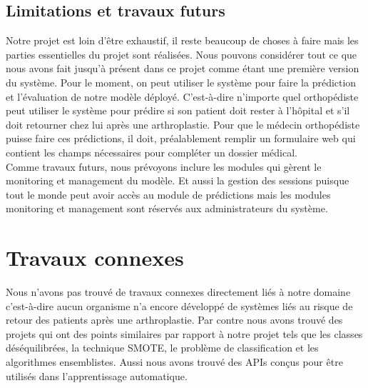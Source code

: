 \documentclass[12pt, french]{report}
\begin{document}
\section{Limitations et travaux futurs}
Notre projet est loin d'être exhaustif, il reste beaucoup de choses à faire mais les parties essentielles du projet sont réalisées. Nous pouvons considérer tout ce que nous avons fait jusqu'à présent dans ce projet comme étant une première version du système. Pour le moment, on peut utiliser le système pour faire la prédiction et l'évaluation de notre modèle déployé. C'est-à-dire n'importe quel orthopédiste peut utiliser le système pour prédire si son patient doit rester à l'hôpital et s'il doit retourner chez lui après une arthroplastie. Pour que le médecin orthopédiste puisse faire ces prédictions, il doit, préalablement remplir un formulaire web qui contient les champs nécessaires pour compléter un dossier médical.   \\

Comme travaux futurs, nous prévoyons inclure les modules qui gèrent le monitoring et management du modèle. Et aussi la gestion des sessions puisque tout le monde peut avoir accès au module de prédictions mais les modules monitoring et management sont réservés aux administrateurs du système.    
\newpage

\chapter{Travaux connexes}
Nous n'avons pas trouvé de travaux connexes directement liés à notre domaine c'est-à-dire aucun organisme n'a encore développé de systèmes liés au risque de retour des patients après une arthroplastie. Par contre nous avons trouvé des projets qui ont des points similaires par rapport à notre projet tels que les classes déséquilibrées, la technique SMOTE, le problème de classification et les algorithmes ensemblistes. Aussi nous avons trouvé des APIs conçus pour être utilisés dans l'apprentissage automatique.\\
\end{document}
